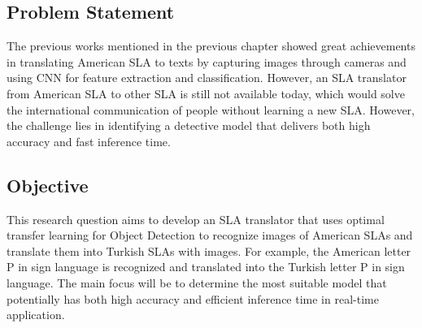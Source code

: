 \subsection{Problem Statement}
The previous works mentioned in the previous chapter showed great achievements in translating American SLA to texts by capturing images through cameras and using CNN for feature extraction and classification. However, an SLA translator from American SLA to other SLA is still not available today, which would solve the international communication of people without learning a new SLA. However, the challenge lies in identifying a detective model that delivers both high accuracy and fast inference time.

\subsection{Objective}
This research question aims to develop an SLA translator that uses optimal transfer learning for Object Detection to recognize images of American SLAs and translate them into Turkish SLAs with images. For example, the American letter P in sign language is recognized and translated into the Turkish letter P in sign language. The main focus will be to determine the most suitable model that potentially has both high accuracy and efficient inference time in real-time application.